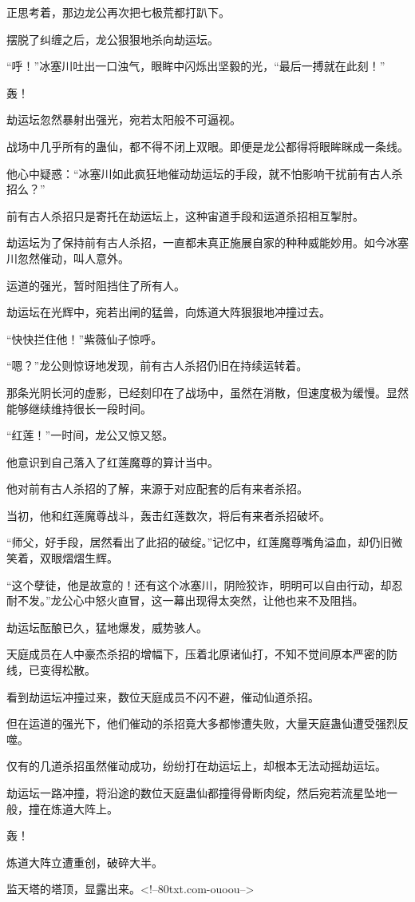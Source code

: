 \begin{this_body}
正思考着，那边龙公再次把七极荒都打趴下。

摆脱了纠缠之后，龙公狠狠地杀向劫运坛。

“呼！”冰塞川吐出一口浊气，眼眸中闪烁出坚毅的光，“最后一搏就在此刻！”

轰！

劫运坛忽然暴射出强光，宛若太阳般不可逼视。

战场中几乎所有的蛊仙，都不得不闭上双眼。即便是龙公都得将眼眸眯成一条线。

他心中疑惑：“冰塞川如此疯狂地催动劫运坛的手段，就不怕影响干扰前有古人杀招么？”

前有古人杀招只是寄托在劫运坛上，这种宙道手段和运道杀招相互掣肘。

劫运坛为了保持前有古人杀招，一直都未真正施展自家的种种威能妙用。如今冰塞川忽然催动，叫人意外。

运道的强光，暂时阻挡住了所有人。

劫运坛在光辉中，宛若出闸的猛兽，向炼道大阵狠狠地冲撞过去。

“快快拦住他！”紫薇仙子惊呼。

“嗯？”龙公则惊讶地发现，前有古人杀招仍旧在持续运转着。

那条光阴长河的虚影，已经刻印在了战场中，虽然在消散，但速度极为缓慢。显然能够继续维持很长一段时间。

“红莲！”一时间，龙公又惊又怒。

他意识到自己落入了红莲魔尊的算计当中。

他对前有古人杀招的了解，来源于对应配套的后有来者杀招。

当初，他和红莲魔尊战斗，轰击红莲数次，将后有来者杀招破坏。

“师父，好手段，居然看出了此招的破绽。”记忆中，红莲魔尊嘴角溢血，却仍旧微笑着，双眼熠熠生辉。

“这个孽徒，他是故意的！还有这个冰塞川，阴险狡诈，明明可以自由行动，却忍耐不发。”龙公心中怒火直冒，这一幕出现得太突然，让他也来不及阻挡。

劫运坛酝酿已久，猛地爆发，威势骇人。

天庭成员在人中豪杰杀招的增幅下，压着北原诸仙打，不知不觉间原本严密的防线，已变得松散。

看到劫运坛冲撞过来，数位天庭成员不闪不避，催动仙道杀招。

但在运道的强光下，他们催动的杀招竟大多都惨遭失败，大量天庭蛊仙遭受强烈反噬。

仅有的几道杀招虽然催动成功，纷纷打在劫运坛上，却根本无法动摇劫运坛。

劫运坛一路冲撞，将沿途的数位天庭蛊仙都撞得骨断肉绽，然后宛若流星坠地一般，撞在炼道大阵上。

轰！

炼道大阵立遭重创，破碎大半。

监天塔的塔顶，显露出来。<!--80txt.com-ouoou-->

\end{this_body}

